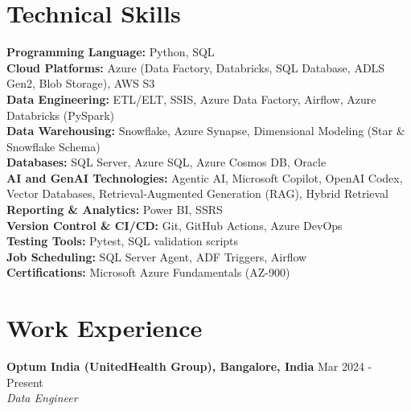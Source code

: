 \documentclass[a4paper,8pt]{article}
\begin{document}
\section{Technical Skills}
\vspace{0.2cm}
\color[HTML]{1C033C}\textbf{Programming Language:} Python, SQL\\[3pt]
\color[HTML]{1C033C}\textbf{Cloud Platforms:} Azure (Data Factory, Databricks, SQL Database, ADLS Gen2, Blob Storage), AWS S3\\[3pt]
\color[HTML]{1C033C}\textbf{Data Engineering:} ETL/ELT, SSIS, Azure Data Factory, Airflow, Azure Databricks (PySpark)\\[3pt]
\color[HTML]{1C033C}\textbf{Data Warehousing:} Snowflake, Azure Synapse, Dimensional Modeling (Star \& Snowflake Schema)\\[3pt]
\color[HTML]{1C033C}\textbf{Databases:} SQL Server, Azure SQL, Azure Cosmos DB, Oracle\\[3pt]
\color[HTML]{1C033C}\textbf{AI and GenAI Technologies:} Agentic AI, Microsoft Copilot, OpenAI Codex, Vector Databases, Retrieval-Augmented Generation (RAG), Hybrid Retrieval\\[3pt]
\color[HTML]{1C033C}\textbf{Reporting \& Analytics:} Power BI, SSRS\\[3pt]
\color[HTML]{1C033C}\textbf{Version Control \& CI/CD:} Git, GitHub Actions, Azure DevOps\\[3pt]
\color[HTML]{1C033C}\textbf{Testing Tools:} Pytest, SQL validation scripts\\[3pt]
\color[HTML]{1C033C}\textbf{Job Scheduling:} SQL Server Agent, ADF Triggers, Airflow\\[3pt]
\color[HTML]{1C033C}\textbf{Certifications:} Microsoft Azure Fundamentals (AZ-900)\\[3pt]
\vspace{-0.3cm}



\section{Work Experience}
\vspace{0.2cm}

\noindent
\textbf{Optum India (UnitedHealth Group), Bangalore, India} \hfill \textcolor[HTML]{371e77}{Mar 2024 - Present} \\
\textit{\textcolor[HTML]{371e77}{Data Engineer}}\\[-1.7em]
\end{document}
